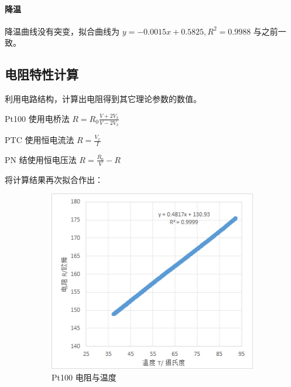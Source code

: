 \documentclass[a4paper]{../phyreport}
\begin{document}
\paragraph{降温}降温曲线没有突变，拟合曲线为 $y=-0.0015x+0.5825,R^2=0.9988$ 与之前一致。

\subsection{电阻特性计算}
利用电路结构，计算出电阻得到其它理论参数的数值。

Pt100 使用电桥法 $R=R_0 \frac{V+2V_x}{V-2V_x}$

PTC 使用恒电流法 $R=\frac{V_x}{I}$

PN 结使用恒电压法 $R=\frac{R_0}{V}-R$

将计算结果再次拟合作出：
\begin{figure}[H]
  \centering
  \begin{subfigure}{.3\textwidth}
    \includegraphics[width=\linewidth]{测量水比热/20240508122746.png}
    \caption{\label{fig:pt100R} Pt100 电阻与温度}
  \end{subfigure}\hfil
  \begin{subfigure}{.3\textwidth}

\end{subfigure}
\end{figure}
\end{document}
